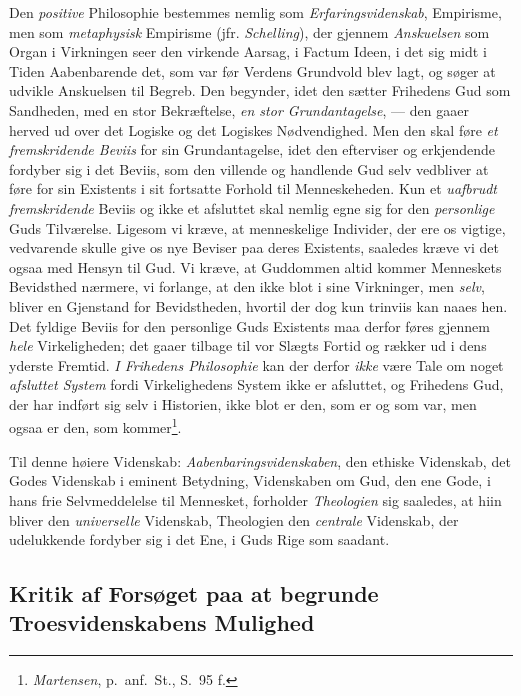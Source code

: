 \documentclass[12pt,a4paper]{book}
\newcommand{\opage}[1]{\marginnote{\footnotesize\textit{[#1]}}}
\begin{document}
Den \emph{positive} Philosophie bestemmes nemlig som \emph{Erfaringsvidenskab}, Empirisme, men
som \emph{metaphysisk} Empirisme (jfr. \emph{Schelling}), der gjennem \emph{Anskuelsen} som Organ i
Virkningen seer den virkende Aarsag, i Factum \opage{101}Ideen, i det sig midt i Tiden Aabenbarende
det, som var før Verdens Grundvold blev lagt, og søger at udvikle Anskuelsen til Begreb.
Den begynder, idet den sætter Frihedens Gud som Sandheden, med en stor Bekræftelse, \emph{en stor Grundantagelse}, --- den gaaer herved ud over det Logiske og det Logiskes
Nødvendighed. Men den skal føre \emph{et fremskridende Beviis} for sin Grundantagelse, idet
den efterviser og erkjendende fordyber sig i det Beviis, som den villende og handlende Gud
selv vedbliver at føre for sin Existents i sit fortsatte Forhold til Menneskeheden.
Kun et \emph{uafbrudt fremskridende} Beviis og ikke et afsluttet skal nemlig egne sig for
den \emph{personlige} Guds Tilværelse. Ligesom vi kræve, at menneskelige Individer, der
ere os vigtige, vedvarende skulle give os nye Beviser paa deres Existents, saaledes kræve
vi det ogsaa med Hensyn til Gud. Vi kræve, at Guddommen altid kommer Menneskets Bevidsthed
nærmere, vi forlange, at den ikke blot i sine Virkninger, men \emph{selv}, bliver en Gjenstand
for Bevidstheden, hvortil der dog kun trinviis kan naaes hen. Det fyldige Beviis for den
personlige Guds Existents maa derfor føres gjennem \emph{hele} Virkeligheden; det gaaer tilbage
til vor Slægts Fortid og rækker ud i dens yderste Fremtid. \emph{I Frihedens Philosophie} kan der derfor \emph{ikke} være Tale om noget \emph{afsluttet System} fordi Virkelighedens System ikke er afsluttet, og Frihedens Gud, der har indført sig selv i Historien, ikke blot er
den, som er og som var, men ogsaa er den, som kommer\footnote{\emph{Martensen}, p.\ anf.\ St.,
S.\ 95 f.}.

Til denne høiere Videnskab: \emph{Aabenbaringsvidenskaben}, den ethiske Videnskab, det
Godes Videnskab i eminent Betydning, Videnskaben om Gud, den ene Gode, i hans frie
Selvmeddelelse til Mennesket, forholder \emph{Theologien} sig saaledes, at hiin bliver den \emph{universelle} Videnskab, Theologien den \emph{centrale} Videnskab, der udelukkende fordyber sig i
det Ene, i Guds Rige som saadant.

\subsection{Kritik af Forsøget paa at begrunde Troesvidenskabens Mulighed}
\label{ssec:troesvidenskab-kritik}
\end{document}
